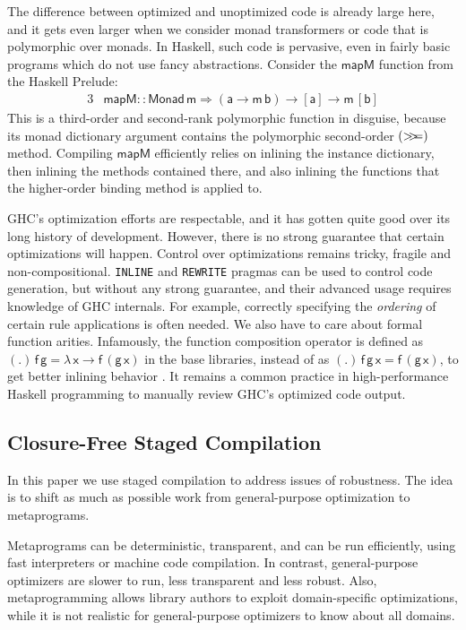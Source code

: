 \documentclass[acmsmall,screen,review,anonymous]{acmart}
\newcommand{\msf}[1]{{\mathsf{#1}}}
\newcommand{\lam}{\lambda\,}
\newcommand{\vm}{\mathsf{m}}
\newcommand{\va}{\mathsf{a}}
\newcommand{\vb}{\mathsf{b}}
\newcommand{\vx}{\mathsf{x}}
\newcommand{\vf}{\mathsf{f}}
\newcommand{\vg}{\mathsf{g}}
\newcommand{\Monad}{\msf{Monad}}
\newcommand{\bind}{\mathbin{>\!\!>\mkern-6.7mu=}}
\theoremstyle{remark}
\begin{document}
The difference between optimized and unoptimized code is already large here, and
it gets even larger when we consider monad transformers or code that is
polymorphic over monads. In Haskell, such code is pervasive, even in fairly
basic programs which do not use fancy abstractions. Consider the $\msf{mapM}$
function from the Haskell Prelude:
\begin{alignat*}{3}
  & \msf{mapM} :: \Monad\,\vm \Rightarrow (\va \to \vm\,\vb) \to [\va] \to \vm\,[\vb]
\end{alignat*}
This is a third-order and second-rank polymorphic function in disguise, because
its monad dictionary argument contains the polymorphic second-order $(\bind)$
method. Compiling $\msf{mapM}$ efficiently relies on inlining the instance
dictionary, then inlining the methods contained there, and also inlining the
functions that the higher-order binding method is applied to.

GHC's optimization efforts are respectable, and it has gotten quite good over
its long history of development. However, there is no strong guarantee that
certain optimizations will happen. Control over optimizations remains tricky,
fragile and non-compositional. \texttt{INLINE} and \texttt{REWRITE} pragmas can
be used to control code generation, but without any strong guarantee, and their
advanced usage requires knowledge of GHC internals. For example, correctly
specifying the \emph{ordering} of certain rule applications is often needed. We
also have to care about formal function arities. Infamously, the function
composition operator is defined as $(.)\,\vf\,\vg = \lam \vx \to \vf\,(\vg\,\vx)$ in the
base libraries, instead of as $(.)\,\vf\,\vg\,\vx = \vf\,(\vg\,\vx)$, to get better inlining
behavior \cite{TODO}. It remains a common practice in high-performance Haskell
programming to manually review GHC's optimized code output.

\subsection{Closure-Free Staged Compilation}

In this paper we use staged compilation to address issues of robustness. The
idea is to shift as much as possible work from general-purpose optimization to
metaprograms.

Metaprograms can be deterministic, transparent, and can be run efficiently,
using fast interpreters or machine code compilation. In contrast,
general-purpose optimizers are slower to run, less transparent and less
robust. Also, metaprogramming allows library authors to exploit
domain-specific optimizations, while it is not realistic for general-purpose
optimizers to know about all domains.
\end{document}
